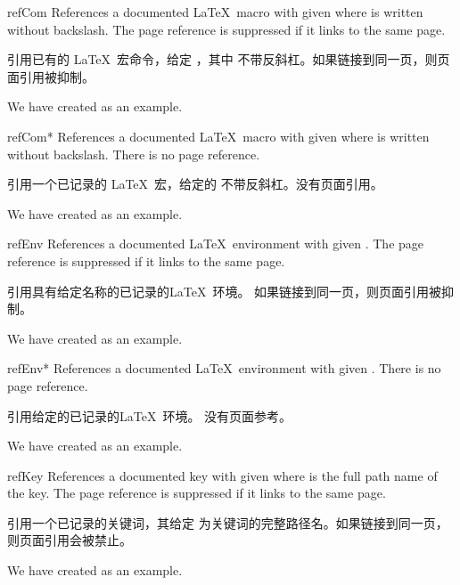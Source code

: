 
\begin{docCommand}{refCom}{}
References a documented \LaTeX\ macro with given  where  is
written without backslash. The page reference is suppressed if it links
to the same page.

引用已有的 \LaTeX\ 宏命令，给定 ，其中  不带反斜杠。如果链接到同一页，则页面引用被抑制。
\begin{dispExample}
We have created  as an example.
\end{dispExample}
\end{docCommand}

\begin{docCommand}{refCom*}{}
References a documented \LaTeX\ macro with given  where  is
written without backslash. There is no page reference.

引用一个已记录的 \LaTeX\ 宏，给定的  不带反斜杠。没有页面引用。
\begin{dispExample}
We have created  as an example.
\end{dispExample}
\end{docCommand}


\begin{docCommand}{refEnv}{}
References a documented \LaTeX\ environment with given .
The page reference is suppressed if it links to the same page.

引用具有给定名称的已记录的\LaTeX\ 环境。 如果链接到同一页，则页面引用被抑制。
\begin{dispExample}
We have created  as an example.
\end{dispExample}
\end{docCommand}

\begin{docCommand}{refEnv*}{}
References a documented \LaTeX\ environment with given .
There is no page reference.

引用给定的已记录的\LaTeX\ 环境。 没有页面参考。
\begin{dispExample}
We have created  as an example.
\end{dispExample}
\end{docCommand}


\begin{docCommand}{refKey}{}
References a documented key with given  where 
is the full path name of the key.
The page reference is suppressed if it links to the same page.

引用一个已记录的关键词，其给定  为关键词的完整路径名。如果链接到同一页，则页面引用会被禁止。
\begin{dispExample}
We have created  as an example.
\end{dispExample}
\end{docCommand}

